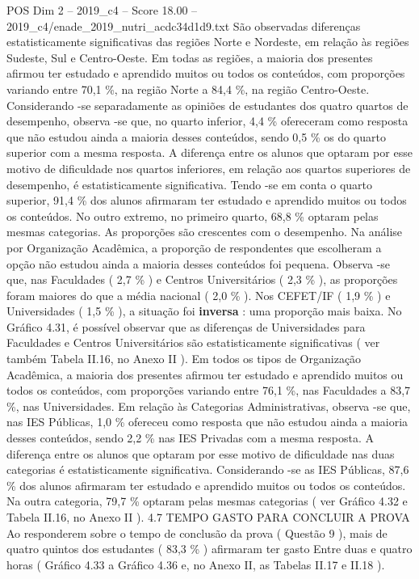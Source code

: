 \begin{textsample}{POS Dim 2 – 2019\_c4 – Score 18.00 – 2019\_c4/enade\_2019\_nutri\_acdc34d1d9.txt}
São observadas diferenças estatisticamente significativas das regiões Norte e Nordeste, em relação às regiões Sudeste, Sul e Centro-Oeste.
Em todas as regiões, a maioria dos presentes afirmou ter estudado e aprendido muitos ou todos os conteúdos, com proporções variando entre 70,1 \%, na região Norte a 84,4 \%, na região Centro-Oeste.
Considerando -se separadamente as opiniões de estudantes dos quatro quartos de desempenho, observa -se que, no quarto inferior, 4,4 \% ofereceram como resposta que não estudou ainda a maioria desses conteúdos, sendo 0,5 \% os do quarto superior com a mesma resposta.
A diferença entre os alunos que optaram por esse motivo de dificuldade nos quartos inferiores, em relação aos quartos superiores de desempenho, é estatisticamente significativa.
Tendo -se em conta o quarto superior, 91,4 \% dos alunos afirmaram ter estudado e aprendido muitos ou todos os conteúdos.
No outro extremo, no primeiro quarto, 68,8 \% optaram pelas mesmas categorias.
As proporções são crescentes com o desempenho.
Na análise por Organização Acadêmica, a proporção de respondentes que escolheram a opção não estudou ainda a maioria desses conteúdos foi pequena.
Observa -se que, nas Faculdades ( 2,7 \% ) e Centros Universitários ( 2,3 \% ), as proporções foram maiores do que a média nacional ( 2,0 \% ).
Nos CEFET/IF ( 1,9 \% ) e Universidades ( 1,5 \% ), a situação foi \textbf{inversa} : uma proporção mais baixa.
No Gráfico 4.31, é possível observar que as diferenças de Universidades para Faculdades e Centros Universitários são estatisticamente significativas ( ver também Tabela II.16, no Anexo II ).
Em todos os tipos de Organização Acadêmica, a maioria dos presentes afirmou ter estudado e aprendido muitos ou todos os conteúdos, com proporções variando entre 76,1 \%, nas Faculdades a 83,7 \%, nas Universidades.
Em relação às Categorias Administrativas, observa -se que, nas IES Públicas, 1,0 \% ofereceu como resposta que não estudou ainda a maioria desses conteúdos, sendo 2,2 \% nas IES Privadas com a mesma resposta.
A diferença entre os alunos que optaram por esse motivo de dificuldade nas duas categorias é estatisticamente significativa.
Considerando -se as IES Públicas, 87,6 \% dos alunos afirmaram ter estudado e aprendido muitos ou todos os conteúdos.
Na outra categoria, 79,7 \% optaram pelas mesmas categorias ( ver Gráfico 4.32 e Tabela II.16, no Anexo II ). 4.7 TEMPO GASTO PARA CONCLUIR A PROVA Ao responderem sobre o tempo de conclusão da prova ( Questão 9 ), mais de quatro quintos dos estudantes ( 83,3 \% ) afirmaram ter gasto Entre duas e quatro horas ( Gráfico 4.33 a Gráfico 4.36 e, no Anexo II, as Tabelas II.17 e II.18 ).

\end{textsample}
